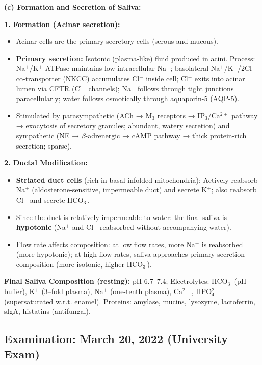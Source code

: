\documentclass[11pt,a4paper]{article}
\begin{document}
\begin{ansbox}
\textbf{(c) Formation and Secretion of Saliva:}

\textbf{1. Formation (Acinar secretion):}
\begin{itemize}[leftmargin=*]
    \item Acinar cells are the primary secretory cells (serous and mucous).
    \item \textbf{Primary secretion:} Isotonic (plasma-like) fluid produced in acini. Process: Na$^+$/K$^+$ ATPase maintains low intracellular Na$^+$; basolateral Na$^+$/K$^+$/2Cl$^-$ co-transporter (NKCC) accumulates Cl$^-$ inside cell; Cl$^-$ exits into acinar lumen via CFTR (Cl$^-$ channels); Na$^+$ follows through tight junctions paracellularly; water follows osmotically through aquaporin-5 (AQP-5).
    \item Stimulated by parasympathetic (ACh → M$_3$ receptors → IP$_3$/Ca$^{2+}$ pathway → exocytosis of secretory granules; abundant, watery secretion) and sympathetic (NE → $\beta$-adrenergic → cAMP pathway → thick protein-rich secretion; sparse).
\end{itemize}

\textbf{2. Ductal Modification:}
\begin{itemize}[leftmargin=*]
    \item \textbf{Striated duct cells} (rich in basal infolded mitochondria): Actively reabsorb Na$^+$ (aldosterone-sensitive, impermeable duct) and secrete K$^+$; also reabsorb Cl$^-$ and secrete HCO$_3^-$.
    \item Since the duct is relatively impermeable to water: the final saliva is \textbf{hypotonic} (Na$^+$ and Cl$^-$ reabsorbed without accompanying water).
    \item Flow rate affects composition: at low flow rates, more Na$^+$ is reabsorbed (more hypotonic); at high flow rates, saliva approaches primary secretion composition (more isotonic, higher HCO$_3^-$).
\end{itemize}

\textbf{Final Saliva Composition (resting):} pH 6.7--7.4; Electrolytes: HCO$_3^-$ (pH buffer), K$^+$ (3--fold plasma), Na$^+$ (one-tenth plasma), Ca$^{2+}$, HPO$_4^{2-}$ (supersaturated w.r.t. enamel). Proteins: amylase, mucins, lysozyme, lactoferrin, sIgA, histatins (antifungal).
\end{ansbox}

\subsection{Examination: March 20, 2022 (University Exam)}
\end{document}
